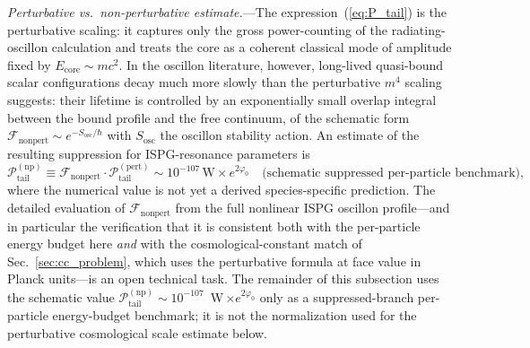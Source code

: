 \documentclass[aps,prd,onecolumn,superscriptaddress,nofootinbib,showpacs,12pt,notitlepage]{revtex4-2}
\begin{document}
\textit{Perturbative vs.\ non-perturbative estimate.}---The
expression~(\ref{eq:P_tail}) is the perturbative scaling: it
captures only the gross power-counting of the radiating-oscillon
calculation and treats the core as a coherent classical mode of
amplitude fixed by $E_{\mathrm{core}} \sim mc^{2}$.  In the
oscillon literature, however, long-lived quasi-bound scalar
configurations decay much more slowly than the perturbative
$m^{4}$ scaling suggests: their lifetime is controlled by an
exponentially small overlap integral between the bound
profile and the free continuum, of the schematic form
$\mathcal{F}_{\mathrm{nonpert}} \sim e^{-S_{\mathrm{osc}}/\hbar}$
with $S_{\mathrm{osc}}$ the oscillon stability action.  An
estimate of the resulting suppression for ISPG-resonance
parameters is
\begin{equation}\label{eq:P_tail_nonpert}
  \mathcal{P}_{\mathrm{tail}}^{\mathrm{(np)}} \equiv
  \mathcal{F}_{\mathrm{nonpert}}\cdot
  \mathcal{P}_{\mathrm{tail}}^{\mathrm{(pert)}}
  \sim 10^{-107}\,\mathrm{W}\times e^{2\varphi_0}
  \quad\text{(schematic suppressed per-particle benchmark)},
\end{equation}
where the numerical value is not yet a derived
species-specific prediction.  The detailed evaluation of
$\mathcal{F}_{\mathrm{nonpert}}$
from the full nonlinear ISPG oscillon profile---and in particular
the verification that it is consistent both with the per-particle
energy budget here \emph{and} with the cosmological-constant
match of Sec.~\ref{sec:cc_problem}, which uses the perturbative
formula at face value in Planck units---is an open technical
task.  The remainder of this subsection uses the schematic value
$\mathcal{P}_{\mathrm{tail}}^{\mathrm{(np)}}
\sim 10^{-107}$~W\,$\times e^{2\varphi_0}$ only as a
suppressed-branch per-particle energy-budget benchmark; it is not
the normalization used for the perturbative cosmological scale
estimate below.
\end{document}
